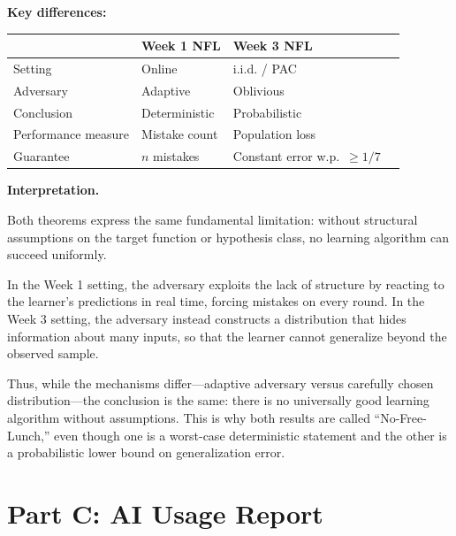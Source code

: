 \documentclass[11pt]{article}
\begin{document}
\begin{solutionbox}
\medskip

\textbf{Key differences:}

\begin{center}
\begin{tabular}{@{}llll@{}}
\toprule
 & \textbf{Week 1 NFL} & \textbf{Week 3 NFL} \\
\midrule
Setting & Online & i.i.d. / PAC \\
Adversary & Adaptive & Oblivious \\
Conclusion & Deterministic & Probabilistic \\
Performance measure & Mistake count & Population loss \\
Guarantee & $n$ mistakes & Constant error w.p.\ $\ge 1/7$ \\
\bottomrule
\end{tabular}
\end{center}

\medskip

\textbf{Interpretation.}

Both theorems express the same fundamental limitation: without structural assumptions on the target function or hypothesis class, no learning algorithm can succeed uniformly.

In the Week 1 setting, the adversary exploits the lack of structure by reacting to the learner’s predictions in real time, forcing mistakes on every round. In the Week 3 setting, the adversary instead constructs a distribution that hides information about many inputs, so that the learner cannot generalize beyond the observed sample.

Thus, while the mechanisms differ—adaptive adversary versus carefully chosen distribution—the conclusion is the same: there is no universally good learning algorithm without assumptions. This is why both results are called “No-Free-Lunch,” even though one is a worst-case deterministic statement and the other is a probabilistic lower bound on generalization error.

\end{solutionbox}

\section{Part C: AI Usage Report}
\end{document}
